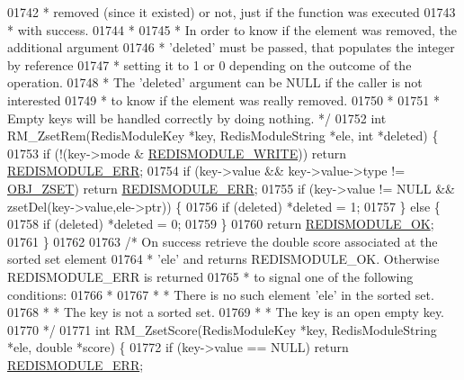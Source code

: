 \begin{DoxyCode}
{{{01742 \textcolor{comment}{ * removed (since it existed) or not, just if the function was executed}
01743 \textcolor{comment}{ * with success.}
01744 \textcolor{comment}{ *}
01745 \textcolor{comment}{ * In order to know if the element was removed, the additional argument}
01746 \textcolor{comment}{ * 'deleted' must be passed, that populates the integer by reference}
01747 \textcolor{comment}{ * setting it to 1 or 0 depending on the outcome of the operation.}
01748 \textcolor{comment}{ * The 'deleted' argument can be NULL if the caller is not interested}
01749 \textcolor{comment}{ * to know if the element was really removed.}
01750 \textcolor{comment}{ *}
01751 \textcolor{comment}{ * Empty keys will be handled correctly by doing nothing. */}
01752 \textcolor{keywordtype}{int} RM\_ZsetRem(RedisModuleKey *key, RedisModuleString *ele, \textcolor{keywordtype}{int} *deleted) \{
01753     \textcolor{keywordflow}{if} (!(key->mode & \hyperlink{redismodule_8h_a73b37117ef94cb4a904361afcc51b6b4}{REDISMODULE\_WRITE})) \textcolor{keywordflow}{return} 
      \hyperlink{redismodule_8h_a3df6f5bd5247289e66f44437a7cddd49}{REDISMODULE\_ERR};
01754     \textcolor{keywordflow}{if} (key->value && key->value->type != \hyperlink{server_8h_a8c356422ddbc03bd77694880a30a1953}{OBJ\_ZSET}) \textcolor{keywordflow}{return} 
      \hyperlink{redismodule_8h_a3df6f5bd5247289e66f44437a7cddd49}{REDISMODULE\_ERR};
01755     \textcolor{keywordflow}{if} (key->value != NULL && zsetDel(key->value,ele->ptr)) \{
01756         \textcolor{keywordflow}{if} (deleted) *deleted = 1;
01757     \} \textcolor{keywordflow}{else} \{
01758         \textcolor{keywordflow}{if} (deleted) *deleted = 0;
01759     \}
01760     \textcolor{keywordflow}{return} \hyperlink{redismodule_8h_a1bc5bfd69abcd378ff52c640adc5418d}{REDISMODULE\_OK};
01761 \}
01762 
01763 \textcolor{comment}{/* On success retrieve the double score associated at the sorted set element}
01764 \textcolor{comment}{ * 'ele' and returns REDISMODULE\_OK. Otherwise REDISMODULE\_ERR is returned}
01765 \textcolor{comment}{ * to signal one of the following conditions:}
01766 \textcolor{comment}{ *}
01767 \textcolor{comment}{ * * There is no such element 'ele' in the sorted set.}
01768 \textcolor{comment}{ * * The key is not a sorted set.}
01769 \textcolor{comment}{ * * The key is an open empty key.}
01770 \textcolor{comment}{ */}
01771 \textcolor{keywordtype}{int} RM\_ZsetScore(RedisModuleKey *key, RedisModuleString *ele, \textcolor{keywordtype}{double} *score) \{
01772     \textcolor{keywordflow}{if} (key->value == NULL) \textcolor{keywordflow}{return} \hyperlink{redismodule_8h_a3df6f5bd5247289e66f44437a7cddd49}{REDISMODULE\_ERR};
}}}
\end{DoxyCode}
